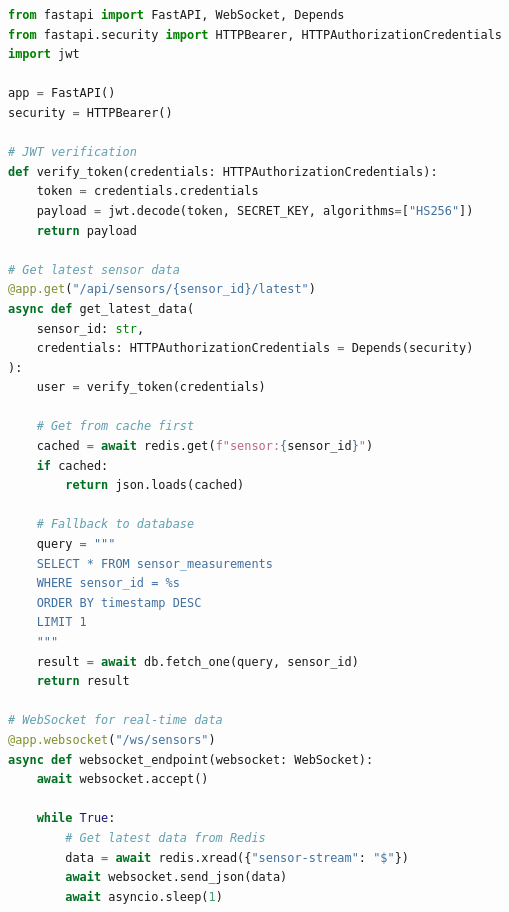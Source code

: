 \begin{lstlisting}[language=Python, caption={API Gateway endpoints}]
from fastapi import FastAPI, WebSocket, Depends
from fastapi.security import HTTPBearer, HTTPAuthorizationCredentials
import jwt

app = FastAPI()
security = HTTPBearer()

# JWT verification
def verify_token(credentials: HTTPAuthorizationCredentials):
    token = credentials.credentials
    payload = jwt.decode(token, SECRET_KEY, algorithms=["HS256"])
    return payload

# Get latest sensor data
@app.get("/api/sensors/{sensor_id}/latest")
async def get_latest_data(
    sensor_id: str,
    credentials: HTTPAuthorizationCredentials = Depends(security)
):
    user = verify_token(credentials)
    
    # Get from cache first
    cached = await redis.get(f"sensor:{sensor_id}")
    if cached:
        return json.loads(cached)
    
    # Fallback to database
    query = """
    SELECT * FROM sensor_measurements
    WHERE sensor_id = %s
    ORDER BY timestamp DESC
    LIMIT 1
    """
    result = await db.fetch_one(query, sensor_id)
    return result

# WebSocket for real-time data
@app.websocket("/ws/sensors")
async def websocket_endpoint(websocket: WebSocket):
    await websocket.accept()
    
    while True:
        # Get latest data from Redis
        data = await redis.xread({"sensor-stream": "$"})
        await websocket.send_json(data)
        await asyncio.sleep(1)
\end{lstlisting}
